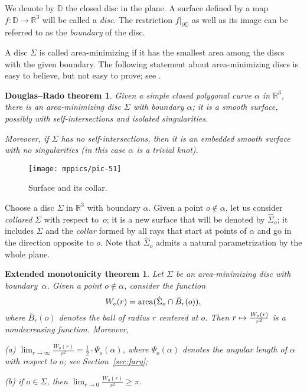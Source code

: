 \documentclass{article}
\newcommand*{\z}[1]{#1\nobreak\discretionary{}%
            {\hbox{$\mathsurround=0pt #1$}}{}}
\theoremstyle{theorem}
\newtheorem{Crofton-type formula}[theorem]{Crofton-type formula}
\newtheorem{Douglas--Rado theorem}[theorem]{Douglas--Rado theorem}
\newtheorem{Extended monotonicity theorem}[theorem]{Extended monotonicity theorem}
\theoremstyle{definition}
\def\area{\mathop{\rm area}\nolimits}
\def\ge{\geqslant}
\begin{document}
We denote by $\mathbb{D}$ the closed disc in the plane.
A surface defined by a map $f\colon\mathbb{D}\to\mathbb{R}^3$ will be called a \emph{disc}.
The restriction $f|_{\partial \mathbb{D}}$ as well as its image can be referred to as the \emph{boundary} of the disc.

A disc $\Sigma$ is called area-minimizing if it has the smallest area among the discs with the given boundary.
The following statement about area-minimizing discs is easy to believe, but not easy to prove; see \cite{white-lectures}.

\begin{Douglas--Rado theorem}\label{thm:min-exists}
Given a simple closed polygonal curve $\alpha$ in $\mathbb{R}^3$, there is an area-minimizing disc $\Sigma$ with boundary $\alpha$; it is a smooth surface, possibly with self-intersections and isolated singularities.

Moreover, if $\Sigma$ has no self-intersections, then it is an embedded smooth surface with no singularities (in this case $\alpha$ is a trivial knot).
\end{Douglas--Rado theorem}

\begin{figure}[!ht]
\vskip-0mm
\centering
\texttt{[image: mppics/pic-51]}
\caption{Surface and its collar.}
\vskip0mm
\end{figure}

Choose a disc $\Sigma$ in $\mathbb{R}^3$ with boundary $\alpha$.
Given a point $o\notin \alpha$, let us consider \emph{collared} $\Sigma$ with respect to~$o$;
it is a new surface that will be denoted by $\hat\Sigma_o$;
it includes $\Sigma$ and the \emph{collar} formed by all rays that start at points of $\alpha$ and go in the direction opposite to $o$.
Note that $\hat\Sigma_o$ admits a natural parametrization by the whole plane.

\begin{Extended monotonicity theorem}\label{thm:monotonicity}
Let $\Sigma$ be an area-minimizing disc with boundary~$\alpha$.
Given a point $o\notin \alpha$, consider the function 
\[W_o(r)=\area (\hat\Sigma_o\cap \bar B_r(o)),\]
where $\bar B_r(o)$ denotes the ball of radius $r$ centered at $o$.
Then $r\z\mapsto \frac{W_o(r)}{r^2}$ is a nondecreasing function.
Moreover, 

\noindent(a)
$\lim_{r\to\infty}\frac{W_o(r)}{r^2}=\tfrac12\cdot \Psi_o(\alpha)$, where $\Psi_o(\alpha)$ denotes the angular length of $\alpha$ with respect to $o$; see Section~\ref{sec:fary};

\noindent(b) if $o\in \Sigma$, then $\lim_{r\to0}\frac{W_o(r)}{r^2}\ge \pi$.

\end{Extended monotonicity theorem}
\end{document}
